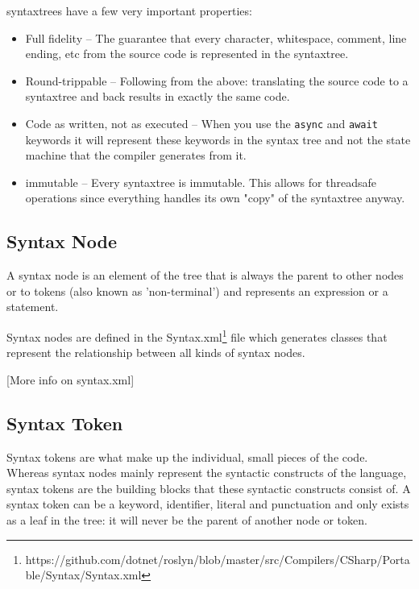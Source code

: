 \Glspl{syntaxtree} have a few very important properties:

\begin{itemize}
	\item Full fidelity -- The guarantee that every character, whitespace, comment, line ending, etc from the source code is represented in the \gls{syntaxtree}.
	\item Round-trippable -- Following from the above: translating the source code to a \gls{syntaxtree} and back results in exactly the same code.
	\item Code as written, not as executed -- When you use the \texttt{async} and \texttt{await} keywords it will represent these keywords in the syntax tree and not the state machine that the compiler generates from it.
	\item \gls{immutable} -- Every \gls{syntaxtree} is immutable. This allows for \gls{threadsafe} operations since everything handles its own "copy" of the \gls{syntaxtree} anyway.
\end{itemize}

\subsection{Syntax Node}
\label{sec:syntax-node}

A syntax node is an element of the tree that is always the parent to other nodes or to tokens (also known as 'non-terminal') and represents an expression or a statement. 

Syntax nodes are defined in the Syntax.xml\footnote{https://github.com/dotnet/roslyn/blob/master/src/Compilers/CSharp/Portable/Syntax/Syntax.xml} file which generates classes that represent the relationship between all kinds of syntax nodes. 

[More info on syntax.xml]

\subsection{Syntax Token}
\label{sec:syntax-token}

Syntax tokens are what make up the individual, small pieces of the code. Whereas syntax nodes mainly represent the syntactic constructs of the language, syntax tokens are the building blocks that these syntactic constructs consist of.
A syntax token can be a keyword, identifier, literal and punctuation and only exists as a leaf in the tree: it will never be the parent of another node or token.

